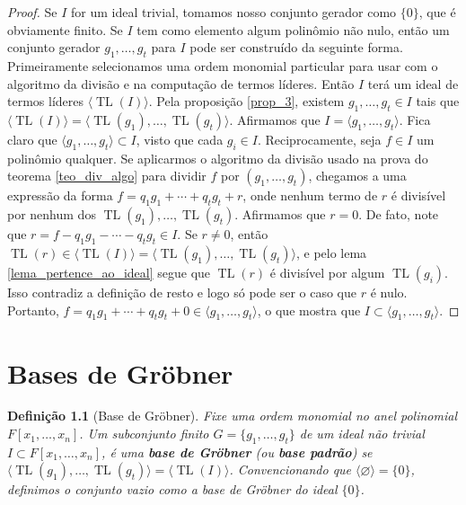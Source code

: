 \documentclass[12pt,a4paper]{report}
\newtheorem{definition}[theorem]{Definição}
\numberwithin{theorem}{chapter}
\DeclareMathOperator{\TL}{TL}
\begin{document}
\begin{proof}
  Se \(I\) for um ideal trivial, tomamos nosso conjunto gerador como
  \(\{0\}\), que é obviamente finito.  Se \(I\) tem como elemento
  algum polinômio não nulo, então um conjunto gerador
  \(g_1,\ldots,g_t\) para \(I\) pode ser construído da seguinte forma.
  Primeiramente selecionamos uma ordem monomial particular para usar
  com o algoritmo da divisão e na computação de termos líderes.  Então
  \(I\) terá um ideal de termos líderes \(\langle \TL(I) \rangle\).
  Pela proposição \ref{prop_3}, existem \(g_1,\ldots,g_t \in I\) tais
  que \(\langle \TL(I) \rangle = \langle \TL(g_1),\ldots,\TL(g_t)
  \rangle\).  Afirmamos que \(I = \langle g_1,\ldots,g_t \rangle\).
  Fica claro que \(\langle g_1,\ldots,g_t \rangle \subset I\), visto
  que cada \(g_i \in I\).  Reciprocamente, seja \(f \in I\) um
  polinômio qualquer.  Se aplicarmos o algoritmo da divisão usado na
  prova do teorema \ref{teo_div_algo} para dividir \(f\) por
  \((g_1,\ldots,g_t)\), chegamos a uma expressão da forma \(f = q_1g_1
  + \cdots + q_tg_t + r\), onde nenhum termo de \(r\) é divisível por
  nenhum dos \(\TL(g_1),\ldots,\TL(g_t)\).  Afirmamos que \(r = 0\).
  De fato, note que \(r = f - q_1g_1 - \cdots - q_tg_t \in I\).  Se
  \(r \neq 0\), então \(\TL(r) \in \langle \TL(I) \rangle = \langle
  \TL(g_1),\ldots,\TL(g_t) \rangle\), e pelo lema
  \ref{lema_pertence_ao_ideal} segue que \(\TL(r)\) é divisível por
  algum \(\TL(g_i)\).  Isso contradiz a definição de resto e logo só
  pode ser o caso que \(r\) é nulo.  Portanto, \(f = q_1g_1 + \cdots +
  q_tg_t + 0 \in \langle g_1,\ldots,g_t\rangle\), o que mostra que \(I
  \subset \langle g_1,\ldots,g_t \rangle\).
\end{proof}



\chapter{Bases de Gröbner}

\begin{definition}[Base de Gröbner]
  Fixe uma ordem monomial no anel polinomial \(F[x_1,\ldots,x_n]\).
  Um subconjunto finito \(G = \{g_1,\ldots,g_t\}\) de um ideal não
  trivial \(I \subset F[x_1,\ldots,x_n]\), é uma \textbf{base de
    Gröbner} (ou \textbf{base padrão}) se \(\langle
  \TL(g_1),\ldots,\TL(g_t)\rangle = \langle \TL(I) \rangle\).
  Convencionando que \(\langle \varnothing \rangle = \{0\}\),
  definimos o conjunto vazio como a base de Gröbner do ideal
  \(\{0\}\).
\end{definition}
\end{document}
